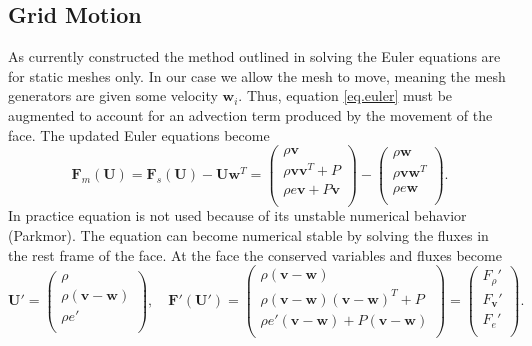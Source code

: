 \subsection{Grid Motion}
As currently constructed the method outlined in solving the Euler equations are 
for static meshes only. In our case we allow the mesh to move, meaning the mesh
generators are given some velocity $\mathbf{w}_i$. Thus, equation \ref{eq.euler}
must be augmented to account for an advection term produced by the movement
of the face. The updated Euler equations become
%
\begin{equation}
	\label{eq.euler.moving}
    \mathbf{F}_m(\mathbf{U}) = \mathbf{F}_s(\mathbf{U})
    	- \mathbf{U}\mathbf{w}^T =
    \left(
    \begin{array}{c}
        \rho\mathbf{v} \\
        \rho\mathbf{v}\mathbf{v}^T + P \\
        \rho e\mathbf{v} + P\mathbf{v} \\
    \end{array}
    \right) -
    \left(
    \begin{array}{c}
        \rho\mathbf{w} \\
        \rho\mathbf{v}\mathbf{w}^T \\
        \rho e\mathbf{w} \\
    \end{array}
    \right).
\end{equation}
%
In practice equation  is not used because of its unstable
numerical behavior (Parkmor). The equation can become numerical stable by
solving the fluxes in the rest frame of the face. At the face the conserved 
variables and fluxes become
%
\begin{equation}
	\mathbf{U}' =
    \left(
    \begin{array}{c}
        \rho \\
        \rho(\mathbf{v-w}) \\
        \rho e' \\
    \end{array} \right),
    \quad
   	\mathbf{F}'(\mathbf{U}') = 
    \left(
    \begin{array}{c}
        \rho(\mathbf{v-w}) \\
        \rho(\mathbf{v-w})(\mathbf{v-w})^T + P \\
        \rho e'(\mathbf{v-w}) + P(\mathbf{v-w}) \\
    \end{array}\right) =
    \left(
        \begin{array}{c}
        F_\rho' \\
        F_\mathbf{v}' \\
        F_e' \\
    \end{array}
    \right).
\end{equation}
